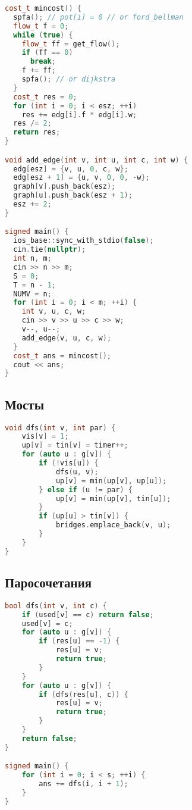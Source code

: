 \documentclass[10pt,a4paper,landscape,twosided]{extarticle}
\begin{document}
\begin{multicols}{3}
\begin{lstlisting}[language=C++]
cost_t mincost() {
  spfa(); // pot[i] = 0 // or ford_bellman
  flow_t f = 0;
  while (true) {
    flow_t ff = get_flow();
    if (ff == 0)
      break;
    f += ff;
    spfa(); // or dijkstra
  }
  cost_t res = 0;
  for (int i = 0; i < esz; ++i)
    res += edg[i].f * edg[i].w;
  res /= 2;
  return res;
}

void add_edge(int v, int u, int c, int w) {
  edg[esz] = {v, u, 0, c, w};
  edg[esz + 1] = {u, v, 0, 0, -w};
  graph[v].push_back(esz);
  graph[u].push_back(esz + 1);
  esz += 2;
}

signed main() {
  ios_base::sync_with_stdio(false);
  cin.tie(nullptr);
  int n, m;
  cin >> n >> m;
  S = 0;
  T = n - 1;
  NUMV = n;
  for (int i = 0; i < m; ++i) {
    int v, u, c, w;
    cin >> v >> u >> c >> w;
    v--, u--;
    add_edge(v, u, c, w);
  }
  cost_t ans = mincost();
  cout << ans;
}


\end{lstlisting}

\subsection{Мосты}
\begin{lstlisting}[language=C++]
void dfs(int v, int par) {
    vis[v] = 1;
    up[v] = tin[v] = timer++;
    for (auto u : g[v]) {
        if (!vis[u]) {
            dfs(u, v);
            up[v] = min(up[v], up[u]);
        } else if (u != par) {
            up[v] = min(up[v], tin[u]);
        }
        if (up[u] > tin[v]) {
            bridges.emplace_back(v, u);
        }
    }
}

\end{lstlisting}

\subsection{Паросочетания}
\begin{lstlisting}[language=C++]
bool dfs(int v, int c) {
    if (used[v] == c) return false;
    used[v] = c;
    for (auto u : g[v]) {
        if (res[u] == -1) {
            res[u] = v;
            return true;
        }
    }
    for (auto u : g[v]) {
        if (dfs(res[u], c)) {
            res[u] = v;
            return true;
        }
    }
    return false;
}

signed main() {
    for (int i = 0; i < s; ++i) {
        ans += dfs(i, i + 1);
    }
}

\end{lstlisting}


\end{multicols}
\end{document}
